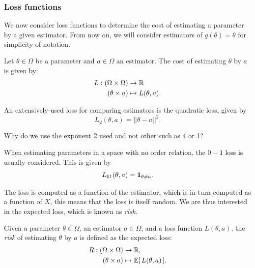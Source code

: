 \subsubsection{Loss functions}

We now consider loss functions to determine the cost of estimating a parameter by a given estimator. From now on, we will consider estimators of $g(\theta) = \theta$ for simplicity of notation.

\begin{definition}
Let $\theta\in\Omega$ be a parameter and $a\in\Omega$ an estimator. The cost of estimating $\theta$ by $a$ is given by:
\begin{align}
    L: (\Omega \times \Omega) &\rightarrow \mathbb{R}\\
    (\theta \times a) &\mapsto L(\theta,a).
\end{align}

\end{definition}

\begin{example}
	\label{ex:costo_cuadrático}
An extensively-used loss for comparing estimators is the {quadratic loss}, given by   
$$
L_2(\theta,a) = ||\theta-a||^{2}.
$$
\end{example}

\begin{remark}
Why do we use the exponent 2 used and not other such as 4 or 1?
\end{remark}


\begin{example}[$0-1$ loss][nobreak=true]
	\label{ex:costo_0-1}
When estimating parameters in a space with no order relation, the $0-1$ loss is usually considered. This is given by
$$
L_{01}(\theta,a) = {\mathbf 1}_{\theta\neq a}.
$$
\end{example}

The loss is computed as a function of the estimator, which is in turn computed as a function of $X$, this means that the loss is itself random. We are thus interested in the expected loss, which is known as \textit{risk}. 

\begin{definition}[Risk]
Given a parameter $\theta \in \Omega$, an estimator $a \in \Omega$, and a loss function $L(\theta,a)$, the \emph{risk} of estimating $\theta$ by $a$ is defined as the expected loss:
\begin{align}
    R: (\Omega \times \Omega) &\rightarrow \mathbb{R},\\
    (\theta \times a) &\mapsto \mathbb{E}[\,L(\theta,a)\,].
\end{align}
\end{definition}

